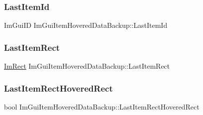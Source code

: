 \subsubsection{\texorpdfstring{Last\+Item\+Id}{LastItemId}}
{\footnotesize\ttfamily Im\+Gui\+ID Im\+Gui\+Item\+Hovered\+Data\+Backup\+::\+Last\+Item\+Id}

\hypertarget{struct_im_gui_item_hovered_data_backup_ae489c222bed561950104a46ddf1387f3}{}\label{struct_im_gui_item_hovered_data_backup_ae489c222bed561950104a46ddf1387f3} 
\subsubsection{\texorpdfstring{Last\+Item\+Rect}{LastItemRect}}
{\footnotesize\ttfamily \hyperlink{struct_im_rect}{Im\+Rect} Im\+Gui\+Item\+Hovered\+Data\+Backup\+::\+Last\+Item\+Rect}

\hypertarget{struct_im_gui_item_hovered_data_backup_a48dd47c573d5299de25be908d77f23f0}{}\label{struct_im_gui_item_hovered_data_backup_a48dd47c573d5299de25be908d77f23f0} 
\subsubsection{\texorpdfstring{Last\+Item\+Rect\+Hovered\+Rect}{LastItemRectHoveredRect}}
{\footnotesize\ttfamily bool Im\+Gui\+Item\+Hovered\+Data\+Backup\+::\+Last\+Item\+Rect\+Hovered\+Rect}

